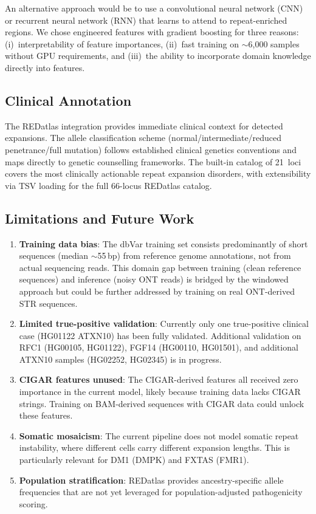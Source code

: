 \documentclass[11pt,twocolumn]{article}
\begin{document}
An alternative approach would be to use a convolutional neural network
(CNN) or recurrent neural network (RNN) that learns to attend to
repeat-enriched regions.  We chose engineered features with gradient
boosting for three reasons: (i)~interpretability of feature importances,
(ii)~fast training on $\sim$6{,}000 samples without GPU requirements,
and (iii)~the ability to incorporate domain knowledge directly into
features.

\subsection{Clinical Annotation}

The REDatlas integration provides immediate clinical context for
detected expansions.  The allele classification scheme
(normal/intermediate/reduced penetrance/full mutation) follows
established clinical genetics conventions and maps directly to
genetic counselling frameworks.  The built-in catalog of 21~loci covers
the most clinically actionable repeat expansion disorders, with
extensibility via TSV loading for the full 66-locus REDatlas catalog.

\subsection{Limitations and Future Work}

\begin{enumerate}[nosep]
    \item \textbf{Training data bias}: The dbVar training set consists
          predominantly of short sequences (median $\sim$55\,bp) from
          reference genome annotations, not from actual sequencing reads.
          This domain gap between training (clean reference sequences) and
          inference (noisy ONT reads) is bridged by the windowed approach
          but could be further addressed by training on real ONT-derived
          STR sequences.
    \item \textbf{Limited true-positive validation}: Currently only one
          true-positive clinical case (HG01122 ATXN10) has been fully
          validated.  Additional validation on RFC1 (HG00105, HG01122),
          FGF14 (HG00110, HG01501), and additional ATXN10 samples
          (HG02252, HG02345) is in progress.
    \item \textbf{CIGAR features unused}: The CIGAR-derived features all
          received zero importance in the current model, likely because
          training data lacks CIGAR strings.  Training on BAM-derived
          sequences with CIGAR data could unlock these features.
    \item \textbf{Somatic mosaicism}: The current pipeline does not
          model somatic repeat instability, where different cells carry
          different expansion lengths.  This is particularly relevant for
          DM1 (DMPK) and FXTAS (FMR1).
    \item \textbf{Population stratification}: REDatlas provides
          ancestry-specific allele frequencies that are not yet leveraged
          for population-adjusted pathogenicity scoring.
\end{enumerate}
\end{document}
